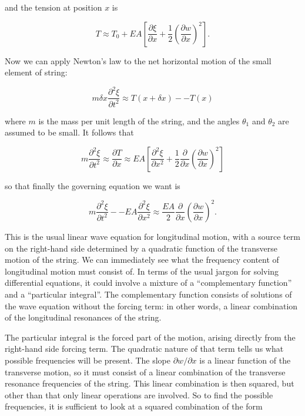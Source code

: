   and the tension at position $x$ is 

  $$T \approx T_0 + EA\left[\dfrac{\partial \xi}{\partial x} + 
  \dfrac{1}{2}\left(\dfrac{\partial w}{\partial x}\right)^2 \right] . \tag{6}$$ 

  Now we can apply Newton's law to the net horizontal motion of the small 
  element of string: 

  $$m \delta x \dfrac{\partial^2 \xi}{\partial t^2} \approx T(x+\delta x) -- 
  T(x) \tag{7}$$ 

  where $m$ is the mass per unit length of the string, and the angles 
  $\theta_1$ and $\theta_2$ are assumed to be small. It follows that 

  $$m \dfrac{\partial^2 \xi}{\partial t^2} \approx \dfrac{\partial T}{\partial 
  x} \approx EA\left[ \dfrac{\partial^2 \xi}{\partial x^2} + \dfrac{1}{2} 
  \dfrac{\partial}{\partial x} \left(\dfrac{\partial w}{\partial x}\right)^2 
  \right] \tag{8}$$ 

  so that finally the governing equation we want is 

  $$m \dfrac{\partial^2 \xi}{\partial t^2} -- EA \dfrac{\partial^2 
  \xi}{\partial x^2} \approx \dfrac{EA}{2} \dfrac{\partial}{\partial x} 
  \left(\dfrac{\partial w}{\partial x}\right)^2 . \tag{9}$$ 

  This is the usual linear wave equation for longitudinal motion, with a source 
  term on the right-hand side determined by a quadratic function of the 
  transverse motion of the string. We can immediately see what the frequency 
  content of longitudinal motion must consist of. In terms of the usual jargon 
  for solving differential equations, it could involve a mixture of a 
  ``complementary function'' and a ``particular integral''. The complementary 
  function consists of solutions of the wave equation without the forcing term: 
  in other words, a linear combination of the longitudinal resonances of the 
  string. 

  The particular integral is the forced part of the motion, arising directly 
  from the right-hand side forcing term. The quadratic nature of that term 
  tells us what possible frequencies will be present. The slope $\partial 
  w/\partial x$ is a linear function of the transverse motion, so it must 
  consist of a linear combination of the transverse resonance frequencies of 
  the string. This linear combination is then squared, but other than that only 
  linear operations are involved. So to find the possible frequencies, it is 
  sufficient to look at a squared combination of the form 

